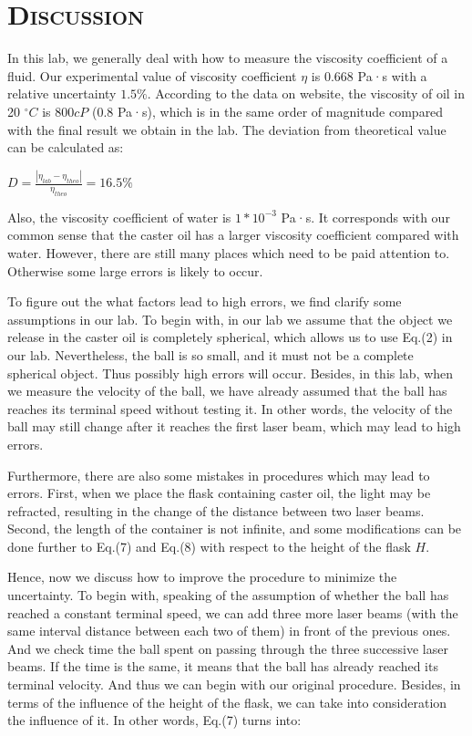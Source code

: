 \documentclass[a4paper,12pt]{article}
\begin{document}
\section{\textsc{Discussion}}
In this lab, we generally deal with how to measure the viscosity coefficient of a fluid. Our experimental value of viscosity coefficient $\eta$ is 0.668 Pa·s with a relative uncertainty $1.5\%$. According to the data on website, the viscosity of oil in 20 $^{\circ} C$ is 800$cP$ (0.8 Pa·s), which is in the same order of magnitude compared with the final result we obtain in the lab\cite{ct1}. The deviation from theoretical value can be calculated as:
\begin{center}
$\displaystyle D = \frac{|\eta_{lab}-\eta_{theo}|}{\eta_{theo}} = 16.5 \%$
\end{center}
Also, the viscosity coefficient of water is $1*10^{-3}$ Pa·s\cite{ct3}. It corresponds with our common sense that the caster oil has a larger viscosity coefficient compared with water. However, there are still many places which need to be paid attention to. Otherwise some large errors is likely to occur.
\par To figure out the what factors lead to high errors, we find clarify some assumptions in our lab. To begin with, in our lab we assume that the object we release in the caster oil is completely spherical, which allows us to use Eq.(2) in our lab. Nevertheless, the ball is so small, and it must not be a complete spherical object. Thus possibly high errors will occur. Besides, in this lab, when we measure the velocity of the ball, we have already assumed that the ball has reaches its terminal speed without testing it. In other words, the velocity of the ball may still change after it reaches the first laser beam, which may lead to high errors.
\par Furthermore, there are also some mistakes in procedures which may lead to errors. First, when we place the flask containing caster oil, the light may be refracted, resulting in the change of the distance between two laser beams. Second, the length of the container is not infinite, and some modifications can be done further to Eq.(7) and Eq.(8) with respect to the height of the flask $H$.
\par Hence, now we discuss how to improve the procedure to minimize the uncertainty. To begin with, speaking of the assumption of whether the ball has reached a constant terminal speed, we can add three more laser beams (with the same interval distance between each two of them) in front of the previous ones. And we check time the ball spent on passing through the three successive laser beams. If the time is the same, it means that the ball has already reached its terminal velocity. And thus we can begin with our original procedure. Besides, in terms of the influence of the height of the flask, we can take into consideration the influence of it. In other words, Eq.(7) turns into:
\end{document}
